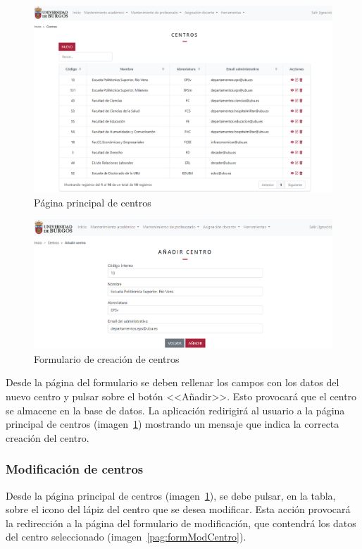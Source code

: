 \begin{figure}
	\centering
	\includegraphics[width=\textwidth]{../img/Anexos/Manual usuario/centros.png}
	\caption{Página principal de centros}\label{pag:centros}
\end{figure}

\begin{figure}
	\centering
	\includegraphics[width=\textwidth]{../img/Anexos/Manual usuario/formCentro.png}
	\caption{Formulario de creación de centros}\label{pag:formCentro}
\end{figure}

Desde la página del formulario se deben rellenar los campos con los datos del nuevo centro y pulsar sobre el botón <<Añadir>>.
Esto provocará que el centro se almacene en la base de datos. 
La aplicación redirigirá al usuario a la página principal de centros (imagen~\ref{pag:centros}) mostrando un mensaje que indica la correcta creación del centro.

\subsubsection{Modificación de centros}
Desde la página principal de centros (imagen~\ref{pag:centros}), se debe pulsar, en la tabla, sobre el icono del lápiz del centro que se desea modificar.
Esta acción provocará la redirección a la página del formulario de modificación, que contendrá los datos del centro seleccionado (imagen~\ref{pag:formModCentro}).

